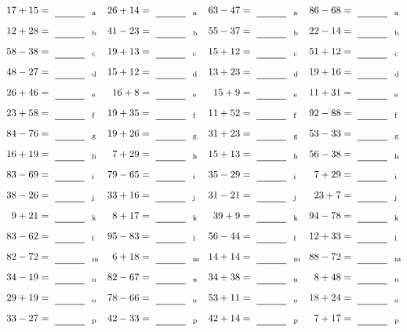 \documentclass
[
  draft    = true,
  fontsize = 11pt,
  parskip  = half-
]
{scrartcl}
\begin{document}
\clearpage
\begin{align*}
    \pline{17+15}&=\rline{a}
  & \pline{26+14}&=\rline{a}
  & \pline{63-47}&=\rline{a}
  & \pline{86-68}&=\rline{a} \\[1ex]
    \pline{12+28}&=\rline{b}
  & \pline{41-23}&=\rline{b}
  & \pline{55-37}&=\rline{b}
  & \pline{22-14}&=\rline{b} \\[1ex]
    \pline{58-38}&=\rline{c}
  & \pline{19+13}&=\rline{c}
  & \pline{15+12}&=\rline{c}
  & \pline{51+12}&=\rline{c} \\[1ex]
    \pline{48-27}&=\rline{d}
  & \pline{15+12}&=\rline{d}
  & \pline{13+23}&=\rline{d}
  & \pline{19+16}&=\rline{d} \\[1ex]
    \pline{26+46}&=\rline{e}
  & \pline{16+8}&=\rline{e}
  & \pline{15+9}&=\rline{e}
  & \pline{11+31}&=\rline{e} \\[1ex]
    \pline{23+58}&=\rline{f}
  & \pline{19+35}&=\rline{f}
  & \pline{11+52}&=\rline{f}
  & \pline{92-88}&=\rline{f} \\[1ex]
    \pline{84-76}&=\rline{g}
  & \pline{19+26}&=\rline{g}
  & \pline{31+23}&=\rline{g}
  & \pline{53-33}&=\rline{g} \\[1ex]
    \pline{16+19}&=\rline{h}
  & \pline{7+29}&=\rline{h}
  & \pline{15+13}&=\rline{h}
  & \pline{56-38}&=\rline{h} \\[1ex]
    \pline{83-69}&=\rline{i}
  & \pline{79-65}&=\rline{i}
  & \pline{35-29}&=\rline{i}
  & \pline{7+29}&=\rline{i} \\[1ex]
    \pline{38-26}&=\rline{j}
  & \pline{33+16}&=\rline{j}
  & \pline{31-21}&=\rline{j}
  & \pline{23+7}&=\rline{j} \\[1ex]
    \pline{9+21}&=\rline{k}
  & \pline{8+17}&=\rline{k}
  & \pline{39+9}&=\rline{k}
  & \pline{94-78}&=\rline{k} \\[1ex]
    \pline{83-62}&=\rline{l}
  & \pline{95-83}&=\rline{l}
  & \pline{56-44}&=\rline{l}
  & \pline{12+33}&=\rline{l} \\[1ex]
    \pline{82-72}&=\rline{m}
  & \pline{6+18}&=\rline{m}
  & \pline{14+14}&=\rline{m}
  & \pline{88-72}&=\rline{m} \\[1ex]
    \pline{34-19}&=\rline{n}
  & \pline{82-67}&=\rline{n}
  & \pline{34+38}&=\rline{n}
  & \pline{8+48}&=\rline{n} \\[1ex]
    \pline{29+19}&=\rline{o}
  & \pline{78-66}&=\rline{o}
  & \pline{53+11}&=\rline{o}
  & \pline{18+24}&=\rline{o} \\[1ex]
    \pline{33-27}&=\rline{p}
  & \pline{42-33}&=\rline{p}
  & \pline{42+14}&=\rline{p}
  & \pline{7+17}&=\rline{p}
\end{align*}
\end{document}
